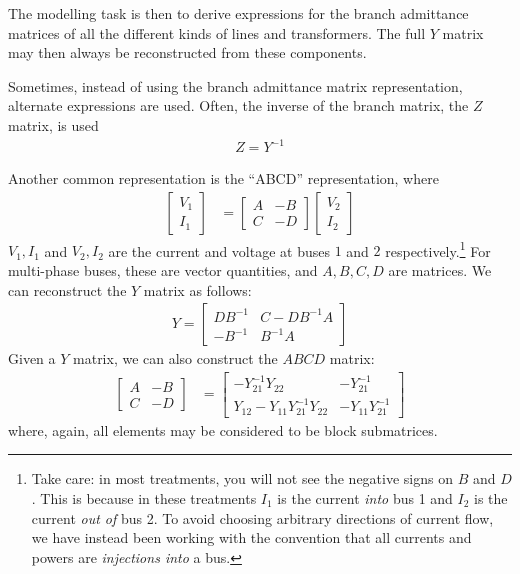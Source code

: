 \documentclass[11pt]{article}
\begin{document}
The modelling task is then to derive expressions for the branch admittance matrices of all the different kinds of lines and transformers. The full $Y$ matrix may then always be reconstructed from these components. 

Sometimes, instead of using the branch admittance matrix representation, alternate expressions are used. Often, the inverse of the branch matrix, the $Z$ matrix, is used
\begin{align}
	Z = Y^{-1}
\end{align}

Another common representation is the ``ABCD'' representation, where
\begin{align}
	\begin{bmatrix}
		V_1 \\ I_1
	\end{bmatrix} &= \begin{bmatrix}
		A & -B \\ C & -D
	\end{bmatrix}\begin{bmatrix}
		V_2 \\ I_2
	\end{bmatrix}
\end{align}
$V_1, I_1$ and $V_2, I_2$ are the current and voltage at buses $1$ and $2$ respectively.\footnote{Take care: in most treatments, you will not see the negative signs on $B$ and $D$. This is because in these treatments $I_1$ is the current \emph{into} bus 1 and $I_2$ is the current \emph{out of} bus 2. To avoid choosing arbitrary directions of current flow, we have instead been working with the convention that all currents and powers are \emph{injections into} a bus.} For multi-phase buses, these are vector quantities, and $A, B, C, D$ are matrices. We can reconstruct the $Y$ matrix as follows:
\begin{align}
	Y = \begin{bmatrix}
		DB^{-1} & C - DB^{-1}A \\
		-B^{-1} & B^{-1}A
	\end{bmatrix}
\end{align}
Given a $Y$ matrix, we can also construct the $ABCD$ matrix:
\begin{align}
	\begin{bmatrix} A & -B \\ C & -D \end{bmatrix} &=
	\begin{bmatrix}
		-Y_{21}^{-1}Y_{22} & -Y_{21}^{-1} \\
		Y_{12} - Y_{11}Y_{21}^{-1}Y_{22} & -Y_{11}Y_{21}^{-1}
	\end{bmatrix}
\end{align}
where, again, all elements may be considered to be block submatrices.
\end{document}
